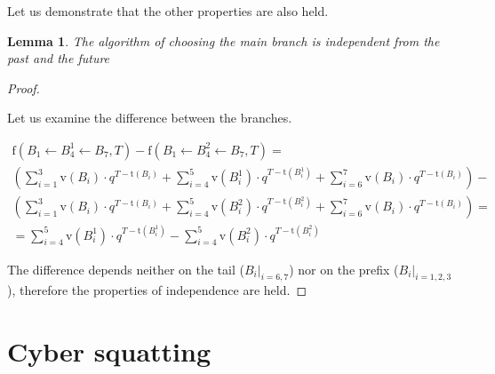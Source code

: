 \documentclass[12pt]{article}
\newtheorem{lemma}{Lemma}[section]
\begin{document}
Let us demonstrate that the other properties are also held.
\begin{lemma}
The algorithm of choosing the main branch is independent from the past and the future
\end{lemma}
\begin{proof}
\begin{figure}[H]
\centering
{}
\end{figure}
Let us examine the difference between the branches.

\begin{multline*}
\mathrm{f}(B_1 \leftarrow B_4^1 \leftarrow B_7, T) - \mathrm{f}(B_1 \leftarrow B_4^2 \leftarrow B_7, T) = \\
\left(
  \sum_{i=1}^{3} \mathrm{v}(B_i) \cdot{} q^{T-\mathrm{t}(B_i)} +
  \sum_{i=4}^{5} \mathrm{v}(B_i^1) \cdot{} q^{T-\mathrm{t}(B_i^1)} + 
  \sum_{i=6}^{7} \mathrm{v}(B_i) \cdot{} q^{T-\mathrm{t}(B_i)} 
\right) - \\
\left(
  \sum_{i=1}^{3} \mathrm{v}(B_i) \cdot{} q^{T-\mathrm{t}(B_i)} +
  \sum_{i=4}^{5} \mathrm{v}(B_i^2) \cdot{} q^{T-\mathrm{t}(B_i^2)} +
  \sum_{i=6}^{7} \mathrm{v}(B_i) \cdot{} q^{T-\mathrm{t}(B_i)}
\right) = \\ =
\sum_{i=4}^{5} \mathrm{v}(B_i^1) \cdot{} q^{T-\mathrm{t}(B_i^1)} - 
\sum_{i=4}^{5} \mathrm{v}(B_i^2) \cdot{} q^{T-\mathrm{t}(B_i^2)}
\end{multline*}

The difference depends neither on the tail ($\left.B_i\right|_{i=6,7}$) nor on the prefix ($\left.B_i\right|_{i=1,2,3}$), therefore the properties of independence are held.
\end{proof}

\section{Cyber squatting}
\end{document}
